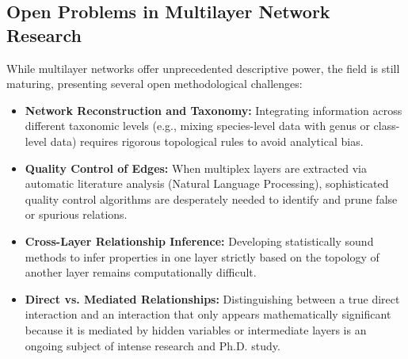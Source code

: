 \subsection{Open Problems in Multilayer Network Research}
\label{subsec:open_problems_multilayer}

While multilayer networks offer unprecedented descriptive power, the field is still maturing, presenting several open methodological challenges:
\begin{itemize}
    \item \textbf{Network Reconstruction and Taxonomy:} Integrating information across different taxonomic levels (e.g., mixing species-level data with genus or class-level data) requires rigorous topological rules to avoid analytical bias.
    \item \textbf{Quality Control of Edges:} When multiplex layers are extracted via automatic literature analysis (Natural Language Processing), sophisticated quality control algorithms are desperately needed to identify and prune false or spurious relations.
    \item \textbf{Cross-Layer Relationship Inference:} Developing statistically sound methods to infer properties in one layer strictly based on the topology of another layer remains computationally difficult.
    \item \textbf{Direct vs. Mediated Relationships:} Distinguishing between a true direct interaction and an interaction that only appears mathematically significant because it is mediated by hidden variables or intermediate layers is an ongoing subject of intense research and Ph.D. study.
\end{itemize}